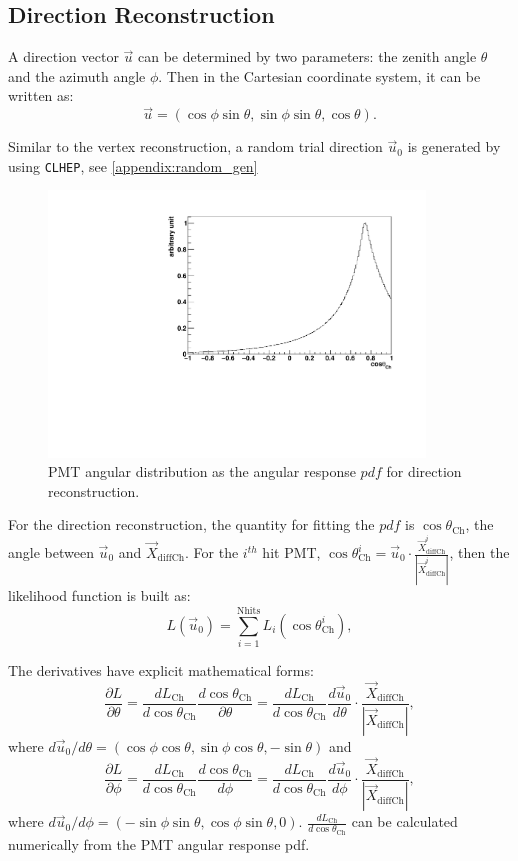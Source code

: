 \subsection{Direction Reconstruction}
A direction vector $\vec{u}$ can be determined by two parameters: the zenith angle $\theta$ and the azimuth angle $\phi$. Then in the Cartesian coordinate system, it can be written as: 
\begin{equation}
\vec{u}=(\cos\phi\sin\theta,\sin\phi\sin\theta,\cos\theta).
\end{equation}

Similar to the vertex reconstruction, a random trial direction $\vec{u}_0$ is generated by using \texttt{CLHEP}, see \ref{appendix:random_gen}

\begin{figure}[!htb]
	\centering
	\includegraphics[width=10cm]{MPW_angularPDF.pdf}
	\caption{PMT angular distribution as the angular response $pdf$ for direction reconstruction.}
	\label{MPW_angularPDF}
\end{figure}


For the direction reconstruction, the quantity for fitting the $pdf$ is $\cos\theta_{\mathrm{Ch}}$, the angle between $\vec{u}_{0}$ and $\vec{X}_{{\mathrm{diffCh}}}$. For the $i^{th}$ hit PMT, $\cos\theta^i_{\mathrm{Ch}}=\vec{u}_0\cdot\frac{\vec{X}^i_{{\mathrm{diffCh}}}}{|\vec{X}^i_{{\mathrm{diffCh}}}|}$, then the likelihood function is built as:
\begin{equation}
L(\vec{u}_0)=\sum_{i=1}^{{\mathrm{Nhits}}}L_i(\cos\theta_{\mathrm{Ch}}^i),
\end{equation}

The derivatives have explicit mathematical forms:
\[
\frac{\partial L}{\partial\theta}=\frac{dL_{\mathrm{Ch}}}{d\cos\theta_{\mathrm{Ch}}}\frac{d\cos\theta_{\mathrm{Ch}}}{\partial\theta}
=\frac{dL_{\mathrm{Ch}}}{d\cos\theta_{\mathrm{Ch}}}\frac{d\vec{u}_0}{d\theta}\cdot\frac{\vec{X}_{{\mathrm{diffCh}}}}{|\vec{X}_{{\mathrm{diffCh}}}|},
\]
where $d\vec{u}_0/d\theta=(\cos\phi\cos\theta, \sin\phi\cos\theta, -\sin\theta)$ and 
\[
\frac{\partial　L}{\partial\phi}=\frac{dL_{\mathrm{Ch}}}{d\cos\theta_{\mathrm{Ch}}}\frac{d\cos\theta_{\mathrm{Ch}}}{d\phi}
=\frac{dL_{\mathrm{Ch}}}{d\cos\theta_{\mathrm{Ch}}}\frac{d\vec{u}_0}{d\phi}\cdot\frac{\vec{X}_{{\mathrm{diffCh}}}}{|\vec{X}_{{\mathrm{diffCh}}}|},
\] where $d\vec{u}_0/d\phi=(-\sin\phi\sin\theta, \cos\phi\sin\theta, 0)$. $\frac{dL_{\mathrm{Ch}}}{d\cos\theta_{\mathrm{Ch}}}$ can be calculated numerically from the PMT angular response pdf.

